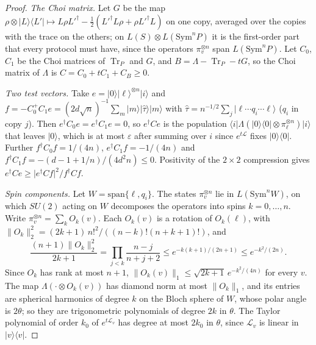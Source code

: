 \documentclass[11pt]{article}
\theoremstyle{remark}
\newcommand{\Lind}{\mathcal{L}}
\newcommand{\tn}[1]{\lVert #1 \rVert_1}
\newcommand{\ket}[1]{\lvert #1 \rangle}
\newcommand{\bra}[1]{\langle #1 \rvert}
\newcommand{\proj}[1]{\lvert #1 \rangle\langle #1 \rvert}
\newcommand{\Sym}{\mathrm{Sym}}
\begin{document}
\begin{proof}
\emph{The Choi matrix.} Let $G$ be the map $\rho \otimes \ket{L}\bra{L'} \mapsto L\rho L'^\dagger - \tfrac12(L'^\dagger L\rho + \rho L'^\dagger L)$ on one copy, averaged over the copies with the trace on the others; on $L(S) \otimes L(\Sym^n P)$ it is the first-order part that every protocol must have, since the operators $\pi_v^{\otimes n}$ span $L(\Sym^n P)$. Let $C_0$, $C_1$ be the Choi matrices of $\operatorname{Tr}_P$ and $G$, and $B = \Lambda - \operatorname{Tr}_P - tG$, so the Choi matrix of $\Lambda$ is $C = C_0 + tC_1 + C_B \ge 0$.

\emph{Two test vectors.} Take $e = \ket{0}\ket{\ell}^{\otimes n}\ket{i}$ and $f = -C_0^+C_1 e = (2d\sqrt n)^{-1}\sum_m \ket{m}\ket{\hat\tau}\ket{m}$ with $\hat\tau = n^{-1/2}\sum_j \ket{\ell\cdots q_i\cdots\ell}$ ($q_i$ in copy $j$). Then $e^\dagger C_0 e = e^\dagger C_1 e = 0$, so $e^\dagger C e$ is the population $\bra{i}\Lambda(\proj{0}\otimes\pi_\ell^{\otimes n})\ket{i}$ that leaves $\ket{0}$, which is at most $\varepsilon$ after summing over $i$ since $e^{t\Lind}$ fixes $\proj{0}$. Further $f^\dagger C_0 f = 1/(4n)$, $e^\dagger C_1 f = -1/(4n)$ and $f^\dagger C_1 f = -(d-1+1/n)/(4d^2 n) \le 0$. Positivity of the $2\times 2$ compression gives $e^\dagger C e \ge \lvert e^\dagger C f\rvert^2 / f^\dagger C f$.

\emph{Spin components.} Let $W = \mathrm{span}\{\ell, q_i\}$. The states $\pi_v^{\otimes n}$ lie in $L(\Sym^n W)$, on which $SU(2)$ acting on $W$ decomposes the operators into spins $k = 0,\dots,n$. Write $\pi_v^{\otimes n} = \sum_k O_k(v)$. Each $O_k(v)$ is a rotation of $O_k(\ell)$, with $\lVert O_k\rVert_2^2 = (2k+1)\,n!^2/((n-k)!(n+k+1)!)$, and
\[
\frac{(n+1)\lVert O_k\rVert_2^2}{2k+1} = \prod_{j<k}\frac{n-j}{n+j+2} \le e^{-k(k+1)/(2n+1)} \le e^{-k^2/(2n)} .
\]
Since $O_k$ has rank at most $n+1$, $\tn{O_k(v)} \le \sqrt{2k+1}\,e^{-k^2/(4n)}$ for every $v$. The map $\Lambda(\cdot\otimes O_k(v))$ has diamond norm at most $\tn{O_k}$, and its entries are spherical harmonics of degree $k$ on the Bloch sphere of $W$, whose polar angle is $2\theta$; so they are trigonometric polynomials of degree $2k$ in $\theta$. The Taylor polynomial of order $k_0$ of $e^{t\Lind_v}$ has degree at most $2k_0$ in $\theta$, since $\Lind_v$ is linear in $\proj{v}$.


\end{proof}
\end{document}

